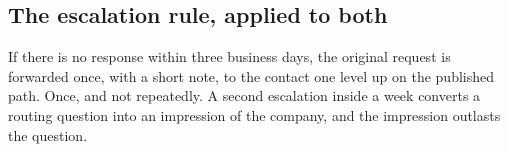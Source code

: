 \subsection{The escalation rule, applied to both}

If there is no response within three business days, the original request is
forwarded once, with a short note, to the contact one level up on the published
path. Once, and not repeatedly. A second escalation inside a week converts a
routing question into an impression of the company, and the impression outlasts
the question.
